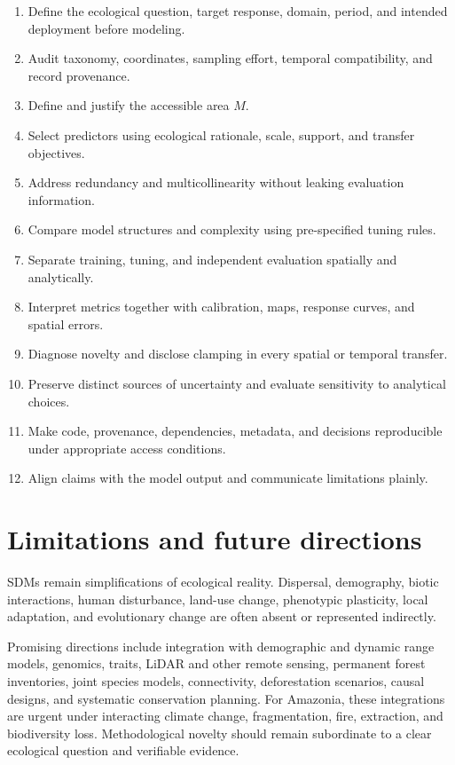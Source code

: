 \begin{enumerate}
\item Define the ecological question, target response, domain, period, and intended deployment before modeling.
\item Audit taxonomy, coordinates, sampling effort, temporal compatibility, and record provenance.
\item Define and justify the accessible area \(M\).
\item Select predictors using ecological rationale, scale, support, and transfer objectives.
\item Address redundancy and multicollinearity without leaking evaluation information.
\item Compare model structures and complexity using pre-specified tuning rules.
\item Separate training, tuning, and independent evaluation spatially and analytically.
\item Interpret metrics together with calibration, maps, response curves, and spatial errors.
\item Diagnose novelty and disclose clamping in every spatial or temporal transfer.
\item Preserve distinct sources of uncertainty and evaluate sensitivity to analytical choices.
\item Make code, provenance, dependencies, metadata, and decisions reproducible under appropriate access conditions.
\item Align claims with the model output and communicate limitations plainly.
\end{enumerate}

\section{Limitations and future directions}

SDMs remain simplifications of ecological reality. Dispersal, demography, biotic interactions, human disturbance, land-use change, phenotypic plasticity, local adaptation, and evolutionary change are often absent or represented indirectly.

Promising directions include integration with demographic and dynamic range models, genomics, traits, LiDAR and other remote sensing, permanent forest inventories, joint species models, connectivity, deforestation scenarios, causal designs, and systematic conservation planning. For Amazonia, these integrations are urgent under interacting climate change, fragmentation, fire, extraction, and biodiversity loss. Methodological novelty should remain subordinate to a clear ecological question and verifiable evidence.


